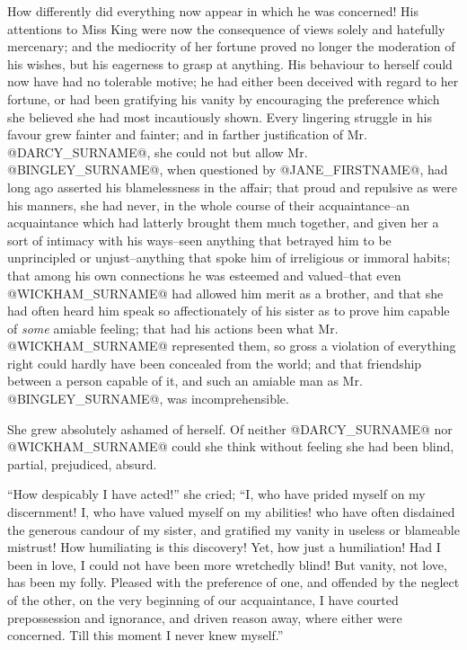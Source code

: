 How differently did everything now appear in which he was concerned!
His attentions to Miss King were now the consequence of views solely and
hatefully mercenary; and the mediocrity of her fortune proved no longer
the moderation of his wishes, but his eagerness to grasp at anything.
His behaviour to herself could now have had no tolerable motive; he had
either been deceived with regard to her fortune, or had been gratifying
his vanity by encouraging the preference which she believed she had most
incautiously shown. Every lingering struggle in his favour grew fainter
and fainter; and in farther justification of Mr. @DARCY_SURNAME@, she could not
but allow Mr. @BINGLEY_SURNAME@, when questioned by @JANE_FIRSTNAME@, had long ago asserted
his blamelessness in the affair; that proud and repulsive as were his
manners, she had never, in the whole course of their acquaintance--an
acquaintance which had latterly brought them much together, and given
her a sort of intimacy with his ways--seen anything that betrayed him
to be unprincipled or unjust--anything that spoke him of irreligious
or immoral habits; that among his own connections he was esteemed and
valued--that even @WICKHAM_SURNAME@ had allowed him merit as a brother, and that
she had often heard him speak so affectionately of his sister as to
prove him capable of \textit{some} amiable feeling; that had his actions been
what Mr. @WICKHAM_SURNAME@ represented them, so gross a violation of everything
right could hardly have been concealed from the world; and that
friendship between a person capable of it, and such an amiable man as
Mr. @BINGLEY_SURNAME@, was incomprehensible.

She grew absolutely ashamed of herself. Of neither @DARCY_SURNAME@ nor @WICKHAM_SURNAME@
could she think without feeling she had been blind, partial, prejudiced,
absurd.

``How despicably I have acted!'' she cried; ``I, who have prided myself
on my discernment! I, who have valued myself on my abilities! who have
often disdained the generous candour of my sister, and gratified
my vanity in useless or blameable mistrust! How humiliating is this
discovery! Yet, how just a humiliation! Had I been in love, I could
not have been more wretchedly blind! But vanity, not love, has been my
folly. Pleased with the preference of one, and offended by the neglect
of the other, on the very beginning of our acquaintance, I have courted
prepossession and ignorance, and driven reason away, where either were
concerned. Till this moment I never knew myself.''

